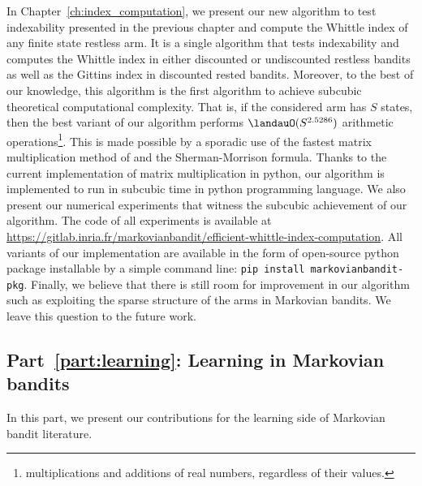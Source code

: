 In Chapter~\ref{ch:index_computation}, we present our new algorithm to test indexability presented in the previous chapter and compute the Whittle index of any finite state restless arm.
It is a single algorithm that tests indexability and computes the Whittle index in either discounted or undiscounted restless bandits as well as the Gittins index in discounted rested bandits.
Moreover, to the best of our knowledge, this algorithm is the first algorithm to achieve subcubic theoretical computational complexity.
That is, if the considered arm has $S$ states, then the best variant of our algorithm performs $\landauO(S^{2.5286})$ arithmetic operations\footnote{multiplications and additions of real numbers, regardless of their values.}.
This is made possible by a sporadic use of the fastest matrix multiplication method of \cite{coppersmith1987matrix} and the Sherman-Morrison formula.
Thanks to the current implementation of matrix multiplication in python, our algorithm is implemented to run in subcubic time in python programming language.
We also present our numerical experiments that witness the subcubic achievement of our algorithm.
The code of all experiments is available at \url{https://gitlab.inria.fr/markovianbandit/efficient-whittle-index-computation}.
All variants of our implementation are available in the form of open-source python package installable by a simple command line: \texttt{pip install markovianbandit-pkg}.
Finally, we believe that there is still room for improvement in our algorithm such as exploiting the sparse structure of the arms in Markovian bandits.
We leave this question to the future work.

\subsection{Part~{\ref{part:learning}}: Learning in Markovian bandits}

In this part, we present our contributions for the learning side of Markovian bandit literature.

